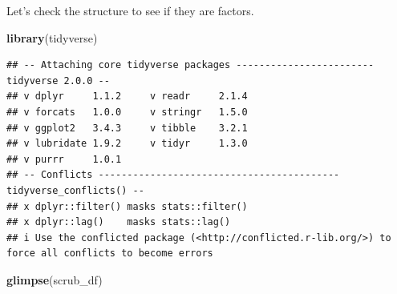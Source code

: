 \documentclass[
  11pt,
]{book}
\newenvironment{Shaded}{\begin{snugshade}}{\end{snugshade}}
\newcommand{\FunctionTok}[1]{\textcolor[rgb]{0.27,0.27,0.27}{\textbf{#1}}}
\newcommand{\NormalTok}[1]{#1}
\begin{document}
Let's check the structure to see if they are factors.

\begin{Shaded}
\begin{Highlighting}[]
\FunctionTok{library}\NormalTok{(tidyverse)}
\end{Highlighting}
\end{Shaded}

\begin{verbatim}
## -- Attaching core tidyverse packages ------------------------ tidyverse 2.0.0 --
## v dplyr     1.1.2     v readr     2.1.4
## v forcats   1.0.0     v stringr   1.5.0
## v ggplot2   3.4.3     v tibble    3.2.1
## v lubridate 1.9.2     v tidyr     1.3.0
## v purrr     1.0.1     
## -- Conflicts ------------------------------------------ tidyverse_conflicts() --
## x dplyr::filter() masks stats::filter()
## x dplyr::lag()    masks stats::lag()
## i Use the conflicted package (<http://conflicted.r-lib.org/>) to force all conflicts to become errors
\end{verbatim}

\begin{Shaded}
\begin{Highlighting}[]
\FunctionTok{glimpse}\NormalTok{(scrub\_df)}
\end{Highlighting}
\end{Shaded}
\end{document}
